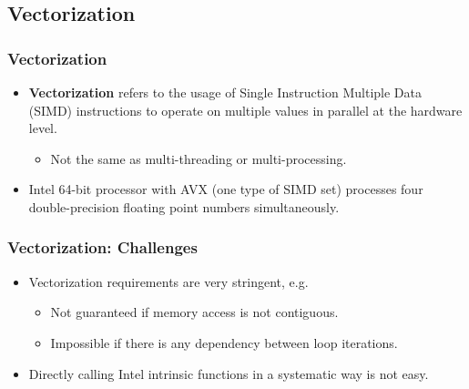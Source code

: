 \subsection{Vectorization}
\frame{\tableofcontents[currentsubsection]}

\begin{frame}
\frametitle{Vectorization}
\begin{itemize}

\item \textbf{Vectorization} refers to the usage of Single Instruction Multiple Data (SIMD) instructions
    to operate on multiple values in parallel at the hardware level.
    \begin{itemize}
        \item Not the same as multi-threading or multi-processing.
    \end{itemize}

\item Intel 64-bit processor with AVX (one type of SIMD set) processes 
    four double-precision floating point numbers simultaneously.

\end{itemize}
\end{frame}

\begin{frame}
\frametitle{Vectorization: Challenges}
\begin{itemize}

\item Vectorization requirements are very stringent, e.g.
    \begin{itemize}
        \item Not guaranteed if memory access is not contiguous.
        \item Impossible if there is any dependency between loop iterations.
    \end{itemize}

\item Directly calling Intel intrinsic functions in a systematic way is not easy.

\end{itemize}
\end{frame}

